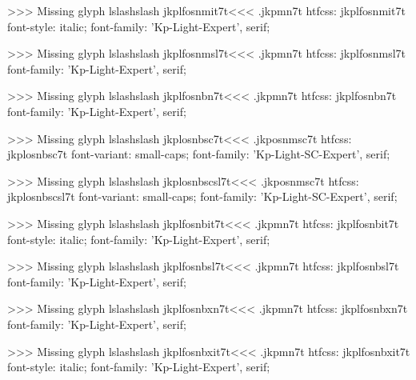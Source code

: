 >>>
Missing glyph	lslashslash
\<jkplfosnmit7t\><<<
.jkpmn7t
htfcss:  jkplfosnmit7t  font-style: italic; font-family: 'Kp-Light-Expert', serif;

>>>
Missing glyph	lslashslash
\<jkplfosnmsl7t\><<<
.jkpmn7t
htfcss:  jkplfosnmsl7t  font-family: 'Kp-Light-Expert', serif;

>>>
Missing glyph	lslashslash
\<jkplfosnbn7t\><<<
.jkpmn7t
htfcss:  jkplfosnbn7t  font-family: 'Kp-Light-Expert', serif;

>>>
Missing glyph	lslashslash
\<jkplosnbsc7t\><<<
.jkposnmsc7t
htfcss:  jkplosnbsc7t  font-variant: small-caps; font-family: 'Kp-Light-SC-Expert', serif;

>>>
Missing glyph	lslashslash
\<jkplosnbscsl7t\><<<
.jkposnmsc7t
htfcss:  jkplosnbscsl7t  font-variant: small-caps; font-family: 'Kp-Light-SC-Expert', serif;

>>>
Missing glyph	lslashslash
\<jkplfosnbit7t\><<<
.jkpmn7t
htfcss:  jkplfosnbit7t  font-style: italic; font-family: 'Kp-Light-Expert', serif;

>>>
Missing glyph	lslashslash
\<jkplfosnbsl7t\><<<
.jkpmn7t
htfcss:  jkplfosnbsl7t  font-family: 'Kp-Light-Expert', serif;

>>>
Missing glyph	lslashslash
\<jkplfosnbxn7t\><<<
.jkpmn7t
htfcss:  jkplfosnbxn7t  font-family: 'Kp-Light-Expert', serif;

>>>
Missing glyph	lslashslash
\<jkplfosnbxit7t\><<<
.jkpmn7t
htfcss:  jkplfosnbxit7t  font-style: italic; font-family: 'Kp-Light-Expert', serif;

